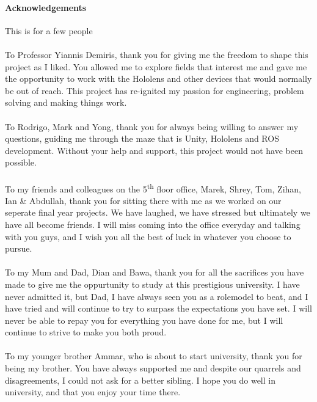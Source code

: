 \newpage

\paragraph{Acknowledgements} This is for a few people

\paragraph{}To Professor Yiannis Demiris, thank you for giving me the freedom to shape this project as I liked. You allowed me to explore fields that interest me and gave me the opportunity to work with the Hololens and other devices that would normally be out of reach. This project has re-ignited my passion for engineering, problem solving and making things work.

\paragraph{}To Rodrigo, Mark and Yong, thank you for always being willing to answer my questions, guiding me through the maze that is Unity, Hololens and ROS development. Without your help and support, this project would not have been possible.

\paragraph{}To my friends and colleagues on the 5\textsuperscript{th} floor office, Marek, Shrey, Tom, Zihan, Ian \& Abdullah, thank you for sitting there with me as we worked on our seperate final year projects. We have laughed, we have stressed but ultimately we have all become friends. I will miss coming into the office everyday and talking with you guys, and I wish you all the best of luck in whatever you choose to pursue.

\paragraph{}To my Mum and Dad, Dian and Bawa, thank you for all the sacrifices you have made to give me the oppurtunity to study at this prestigious university. I have never admitted it, but Dad, I have always seen you as a rolemodel to beat, and I have tried and will continue to try to surpass the expectations you have set. I will never be able to repay you for everything you have done for me, but I will continue to strive to make you both proud.

\paragraph{}To my younger brother Ammar, who is about to start university, thank you for being my brother. You have always supported me and despite our quarrels and disagreements, I could not ask for a better sibling. I hope you do well in university, and that you enjoy your time there.

